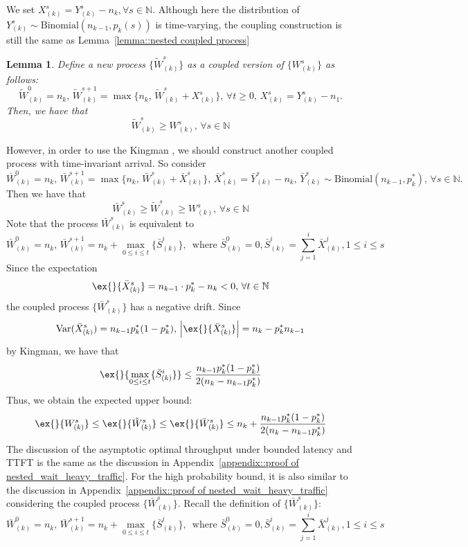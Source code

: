 \documentclass[preprint]{article}
\theoremstyle{plain}
\newtheorem{lemma}[theorem]{Lemma}
\theoremstyle{definition}
\theoremstyle{remark}
\begin{document}
We set $X_{(k)}^s  =  Y_{(k)}^s - n_k, \forall s\in \mathbb{N}$. Although here the distribution of $Y_{(k)}^s\sim \text{Binomial}(n_{k-1},p_k(s))$ is time-varying, the coupling construction is still the same as Lemma~\ref{lemma::nested coupled process}
\begin{lemma}\label{lemma: coupling, time varying}
Define a new process $\{ \tilde{W}_{(k)}^s\}$ as a coupled version of $\{  W_{(k)}^s \}$ as follows:
$$ \tilde{W}_{(k)}^0=n_k, \, \tilde{W}_{(k)}^{s+1} = \max\{ n_k, \, \tilde{W}_{(k)}^s+X_{(k)}^s\},\, \forall t\geq 0 ,\, X_{(k)}^s = Y_{(k)}^s - n_1. $$
Then, we have that 
$$ \tilde{W}^s_{(k)}\geq W^s_{(k)},\,\forall s\in \mathbb{N} $$
\end{lemma}
However, in order to use the Kingman , we should construct another coupled process with time-invariant arrival. So consider
$$\bar{W}_{(k)}^0=n_k,\, \bar{W}_{(k)}^{s+1} = \max\{ n_k,\, \bar{W}_{(k)}^{s}+\bar{X}_{(k)}^s \}, \,\bar{X}_{(k)}^s =\bar{Y}_{(k)}^s  -n_k, \, \bar{Y}_{(k)}^s \sim \text{Binomial}(n_{k-1}, p_k^*),\,\forall s\in \mathbb{N}.  $$
Then we have that 
$$\bar{W}^s_{(k)}\geq \tilde{W}^s_{(k)}\geq W^s_{(k)},\,\forall s\in \mathbb{N}$$
Note that the process $\bar{W}^s_{(k)}$ is equivalent to 
$$ \bar{W}_{(k)}^0 = n_k,\, \bar{W}_{(k)}^{s+1} = n_k + \max_{0\leq i\leq t}\{ \bar{S}_{(k)}^i \} ,\, \text{ where }\bar{S}_{(k)}^0=0, \bar{S}_{(k)}^i = \sum_{j=1}^i \bar{X}_{(k)}^{j}, 1\leq i\leq s $$
Since the expectation
$$ \ex{}{\bar{X}_{(k)}^s} = n_{k-1}\cdot p_{k}^* - n_k <0,\, \forall t\in \mathbb{N} $$
the coupled process $\{\bar{W}_{(k)}^s \}$ has a negative drift. Since 
$$\text{Var}(\bar{X}_{(k)}^s) = n_{k-1}p_k^*(1-p_k^*),\,\left|\ex{}{\bar{X}_{(k)}^s}\right|=n_k - p_k^* n_{k-1}$$
by Kingman, we have that
$$\ex{}{\max_{0\leq i\leq t}\{ \bar{S}_{(k)}^i \}  }\leq  \frac{  n_{k-1}p_k^*(1-p_k^*) }{ 2(n_k - n_{k-1}p_k^*)} $$
Thus, we obtain the expected upper bound:
$$\ex{}{W_{(k)}^s}\leq \ex{}{\tilde{W}_{(k)}^s}\leq \ex{}{\bar{W}_{(k)}^s} \leq n_k + \frac{  n_{k-1}p_k^*(1-p_k^*) }{ 2(n_k - n_{k-1}p_k^*)}$$
The discussion of the asymptotic optimal throughput under bounded latency and TTFT is the same as the discussion in Appendix~\ref{appendix::proof of nested_wait_heavy_traffic}. For the high probability bound, it is also similar to the discussion in Appendix~\ref{appendix::proof of nested_wait_heavy_traffic} considering the coupled process $\{ \bar{W}_{(k)}^s \}$. Recall the definition of $\{ \bar{W}_{(k)}^s \}$:
$$ \bar{W}_{(k)}^0 = n_k,\, \bar{W}_{(k)}^{s+1} = n_k + \max_{0\leq i\leq t}\{ \bar{S}_{(k)}^i \} ,\, \text{ where }\bar{S}_{(k)}^0=0, \bar{S}_{(k)}^i = \sum_{j=1}^i \bar{X}_{(k)}^{j}, 1\leq i\leq s $$
\end{document}
